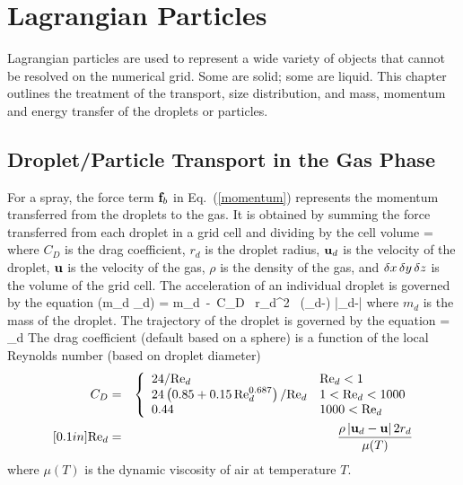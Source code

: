 \chapter{Lagrangian Particles}
\label{chapter:lagrangian_particles}

Lagrangian particles are used to represent a wide variety of objects that cannot be resolved on
the numerical grid. Some are solid; some are liquid. This chapter outlines the treatment of the transport, size
distribution, and mass, momentum and energy transfer of the droplets or particles.

\section{Droplet/Particle Transport in the Gas Phase}

For a spray, the force term ${\bf f}_b$ in Eq.~(\ref{momentum})
represents the momentum transferred from the droplets to the gas.
It is obtained by summing the force transferred from each droplet
in a grid cell and dividing by the cell volume
 = \ha {}
    {\dx \, \dy \, \dz} \ee
where $C_D$ is the drag coefficient, $r_d$ is the droplet radius,
${\bf u}_d$ is the velocity of the droplet, ${\bf u}$ is the
velocity of the gas, $\rho$ is the density of the gas,
and $\delta x \, \delta y \, \delta z$ is the volume of the grid cell.
The acceleration of an individual droplet is governed by the equation
\be
     (m_d \bu_d) = m_d\, \bg - \ha \rho\,C_D \, \pi  r_d^2 \,
    (\bu_d-\bu) |\bu_d-\bu|
\ee
where $m_d$ is the mass of the droplet.  The trajectory of the droplet is governed by the equation
\be
     = \bu_d
\ee
The drag coefficient (default based on a sphere) is a function of the local Reynolds number (based on droplet diameter)
\begin{eqnarray}
 C_D &=& \left\{ \begin{array}{ll}
     24/\hbox{Re}_d                                       & \hbox{Re}_d < 1    \\
     24\left(0.85+0.15 \, \hbox{Re}_d^{0.687} \right)/\hbox{Re}_d  & 1 < \hbox{Re}_d < 1000 \\
     0.44                                           & 1000 < \hbox{Re}_d
     \end{array} \right.  \\ [0.1in]
\hbox{Re}_d &=& \frac{\rho \, |{\bf u}_d-{\bf u}| \, 2 r_d}{\mu(T)} \end{eqnarray}
where $\mu(T)$ is the dynamic viscosity of air at temperature $T$.


